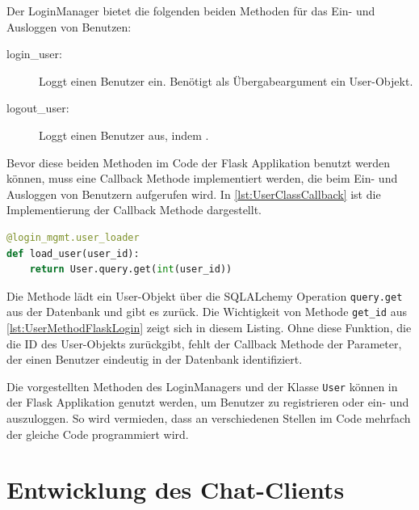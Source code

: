 \documentclass[a4paper,titlepage,halfparskip,12pt]{scrreprt}
\begin{document}
\begin{onehalfspacing}
Der LoginManager bietet die folgenden beiden Methoden für das Ein- und Ausloggen von Benutzen:

\begin{description}
\item[login\_user:] Loggt einen Benutzer ein. Benötigt als Übergabeargument ein User-Objekt.
\item[logout\_user:] Loggt einen Benutzer aus, indem .
\end{description}

Bevor diese beiden Methoden im Code der Flask Applikation benutzt werden können, muss eine Callback Methode implementiert werden, die beim Ein- und Ausloggen von Benutzern aufgerufen wird. In \autoref{lst:UserClassCallback} ist die Implementierung der Callback Methode dargestellt.

\begin{lstlisting}[language=python, caption={Callback Methode für das Modul flask\_login}, label={lst:UserClassCallback}]
@login_mgmt.user_loader
def load_user(user_id):
    return User.query.get(int(user_id))
\end{lstlisting}

Die Methode lädt ein User-Objekt über die SQLALchemy Operation \texttt{query.get} aus der Datenbank und gibt es zurück. Die Wichtigkeit von Methode \texttt{get\_id} aus \autoref{lst:UserMethodFlaskLogin} zeigt sich in diesem Listing. Ohne diese Funktion, die die ID des User-Objekts zurückgibt, fehlt der Callback Methode der Parameter, der einen Benutzer eindeutig in der Datenbank identifiziert.\cite{flaskLogin}

Die vorgestellten Methoden des LoginManagers und der Klasse \texttt{User} können in der Flask Applikation genutzt werden, um Benutzer zu registrieren oder ein- und auszuloggen. So wird vermieden, dass an verschiedenen Stellen im Code mehrfach der gleiche Code programmiert wird.

\pagebreak

\section{Entwicklung des Chat-Clients}
\label{sec:ClientEntwicklung}


\end{onehalfspacing}
\end{document}

